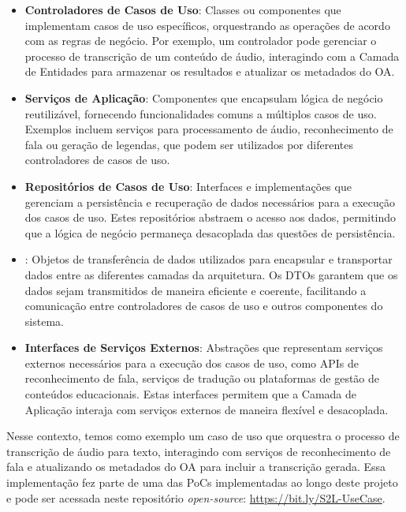 \begin{itemize}
    \item \textbf{Controladores de Casos de Uso}: Classes ou componentes que implementam casos de uso específicos, orquestrando as operações de acordo com as regras de negócio. Por exemplo, um controlador pode gerenciar o processo de transcrição de um conteúdo de áudio, interagindo com a Camada de Entidades para armazenar os resultados e atualizar os metadados do OA.

    \item \textbf{Serviços de Aplicação}: Componentes que encapsulam lógica de negócio reutilizável, fornecendo funcionalidades comuns a múltiplos casos de uso. Exemplos incluem serviços para processamento de áudio, reconhecimento de fala ou geração de legendas, que podem ser utilizados por diferentes controladores de casos de uso.

    \item \textbf{Repositórios de Casos de Uso}: Interfaces e implementações que gerenciam a persistência e recuperação de dados necessários para a execução dos casos de uso. Estes repositórios abstraem o acesso aos dados, permitindo que a lógica de negócio permaneça desacoplada das questões de persistência.

    \item \textbf{}: Objetos de transferência de dados utilizados para encapsular e transportar dados entre as diferentes camadas da arquitetura. Os DTOs garantem que os dados sejam transmitidos de maneira eficiente e coerente, facilitando a comunicação entre controladores de casos de uso e outros componentes do sistema.

    \item \textbf{Interfaces de Serviços Externos}: Abstrações que representam serviços externos necessários para a execução dos casos de uso, como APIs de reconhecimento de fala, serviços de tradução ou plataformas de gestão de conteúdos educacionais. Estas interfaces permitem que a Camada de Aplicação interaja com serviços externos de maneira flexível e desacoplada.
\end{itemize}

Nesse contexto, temos como exemplo um caso de uso que orquestra o processo de transcrição de áudio para texto, interagindo com serviços de reconhecimento de fala e atualizando os metadados do OA para incluir a transcrição gerada. Essa implementação fez parte de uma das PoCs implementadas ao longo deste projeto e pode ser acessada neste repositório \textit{open-source}: \url{https://bit.ly/S2L-UseCase}.

